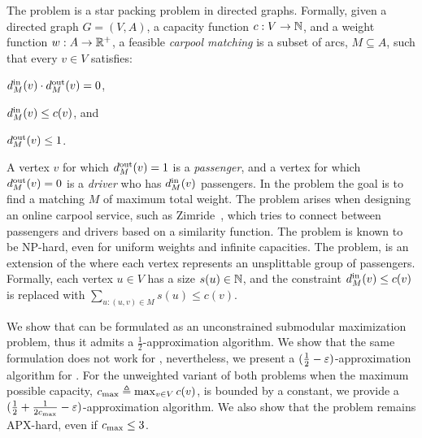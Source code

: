 
The \carpool problem is a star packing problem in directed graphs.
Formally, given a directed graph $G = (V, A)$, a capacity function $c:
V \rightarrow \N$, and a weight function $w: A \rightarrow \R^+$, a
feasible \emph{carpool matching} is a subset of arcs, $M \subseteq A$,
such that every $v \in V$ satisfies:%
\begin{inparaenum}[(i)]
\item $\din[M](v) \cdot \dout[M](v) = 0$,
\item $\din[M](v) \leq c(v)$, and 
\item $\dout[M](v) \leq 1$.
\end{inparaenum}
A vertex $v$ for which $\dout[M](v) = 1$ is a \emph{passenger}, and a
vertex for which $\dout[M](v) = 0$ is a \emph{driver} who has
$\din[M](v)$ passengers.  In the \carpool problem the goal is to find
a matching $M$ of maximum total weight.
%
The problem arises when designing an online carpool service, such as
Zimride~\cite{zimride}, which tries to connect between passengers and
drivers based on a similarity function.  The problem is known to be
NP-hard, even for uniform weights and infinite capacities.
%
The \gcp problem, is an extension of the \carpool where each vertex
represents an unsplittable group of passengers.  Formally, each vertex
$u \in V$ has a size $s(u) \in \N$, and the constraint $\din(v) \leq
c(v)$ is replaced with $\sum_{u:(u,v) \in M} s(u) \leq c(v)$.

We show that \carpool can be formulated as an unconstrained submodular
maximization problem, thus it admits a $\frac{1}{2}$-approximation
algorithm.  We show that the same formulation does not work for \gcp,
nevertheless, we present a $(\frac{1}{2} - \eps)$-approximation
algorithm for \gcp.
%
For the unweighted variant of both problems when the maximum possible
capacity, $\cmax \eqdf \max_{v \in V} c(v)$, is bounded by a constant,
we provide a $(\half + \inv{2\cmax} - \eps)$-approximation algorithm.
We also show that the problem remains APX-hard, even if $\cmax \leq
3$.
